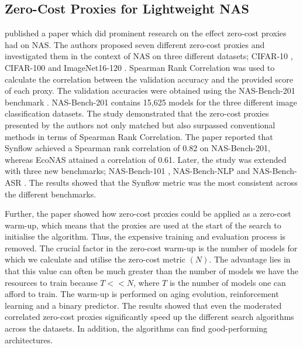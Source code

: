 \subsection{Zero-Cost Proxies for Lightweight NAS}\label{abdelfattah}
\cite{abdelfattah2021zero} published a paper which did prominent research on the effect zero-cost proxies had on \gls{NAS}. The authors proposed seven different zero-cost proxies and investigated them in the context of \gls{NAS} on three different datasets; CIFAR-10 \autocite{Krizhevsky2009LearningML}, CIFAR-100 \autocite{Krizhevsky2009LearningML} and ImageNet16-120 \autocite{deng2009imagenet}. Spearman Rank Correlation was used to calculate the correlation between the validation accuracy and the provided score of each proxy. The validation accuracies were obtained using the NAS-Bench-201 benchmark \autocite{dong2020bench}. NAS-Bench-201 contains 15,625 models for the three different image classification datasets. The study demonstrated that the zero-cost proxies presented by the authors not only matched but also surpassed conventional methods in terms of Spearman Rank Correlation. The paper reported that \gls{Synflow} achieved a Spearman rank correlation of 0.82 on NAS-Bench-201, whereas \gls{EcoNAS} attained a correlation of 0.61. Later, the study was extended with three new benchmarks; NAS-Bench-101 \autocite{ying2019bench}, NAS-Bench-NLP \autocite{https://doi.org/10.48550/arxiv.2006.07116} and NAS-Bench-ASR \autocite{mehrotra2021bench}. The results showed that the \gls{Synflow} metric was the most consistent across the different benchmarks. 

Further, the paper showed how zero-cost proxies could be applied as a zero-cost warm-up, which means that the proxies are used at the start of the search to initialise the algorithm. Thus, the expensive training and evaluation process is removed. The crucial factor in the zero-cost warm-up is the number of models for which we calculate and utilise the zero-cost metric $(N)$. The advantage lies in that this value can often be much greater than the number of models we have the resources to train because $T << N$, where $T$ is the number of models one can afford to train. The warm-up is performed on aging evolution, reinforcement learning and a binary predictor. The results showed that even the moderated correlated zero-cost proxies significantly speed up the different search algorithms across the datasets. In addition, the algorithms can find good-performing architectures. 

\begin{comment}
    
Lastly, the authors showcased how the proxies can be used through a zero-cost move proposal. Contrary to zero-cost warm-up, the zero-cost move proposal concentrates on a local neighbourhood of each step to improve the selection of the following model for evaluation. 
\end{comment}